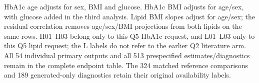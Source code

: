 \documentclass[11pt,letterpaper]{article}
\begin{document}
\endgroup

HbA1c age adjusts for sex, BMI and glucose. HbA1c BMI adjusts for age/\allowbreak{}sex, with glucose added in the third analysis. Lipid BMI slopes adjust for age/\allowbreak{}sex; the residual correlation removes age/\allowbreak{}sex/\allowbreak{}BMI projections from both lipids on the same rows. H01–\allowbreak{}H03 belong only to this Q5 HbA1c request, and L01–\allowbreak{}L03 only to this Q5 lipid request; the L labels do not refer to the earlier Q2 literature arm. All 54 individual primary outputs and all 513 prespecified estimates/\allowbreak{}diagnostics remain in the complete endpoint table. The 324 matched reference comparisons and 189 generated-only diagnostics retain their original availability labels.


\FloatBarrier

\begingroup

\small

\renewcommand{\arraystretch}{1.22}
\end{document}
